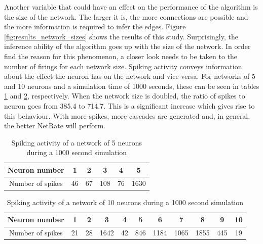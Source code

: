 Another variable that could have an effect on the performance of the algorithm is the size of the network. The larger it is, the more connections are possible and the more information is required to infer the edges. Figure \ref{fig:results_network_sizes} shows the results of this study. Surprisingly, the inference ability of the algorithm goes up with the size of the network. In order find the reason for this phenomenon, a closer look needs to be taken to the number of firings for each network size. Spiking activity conveys information about the effect the neuron has on the network and vice-versa. For networks of 5 and 10 neurons and a simulation time of 1000 seconds, these can be seen in tables \ref{tab:spiking_activity_5_neurons} and \ref{tab:spiking_activity_10_neurons}, respectively. When the network size is doubled, the ratio of spikes to neuron goes from 385.4 to 714.7. This is a significant increase which gives rise to this behaviour. With more spikes, more cascades are generated and, in general, the better NetRate will perform.\\

\begin{table}[]
\centering
\begin{tabular}{|c|c|c|c|c|c|}
\hline
Neuron number    & 1  & 2  & 3   & 4  & 5    \\ \hline
Number of spikes & 46 & 67 & 108 & 76 & 1630 \\ \hline
\end{tabular}
\caption{Spiking activity of a network of 5 neurons during a 1000 second simulation}
\label{tab:spiking_activity_5_neurons}
\end{table}

\begin{table}[]
\centering
\begin{tabular}{|c|c|c|c|c|c|c|c|c|c|c|}
\hline
Neuron number    & 1  & 2  & 3    & 4  & 5   & 6    & 7    & 8    & 9   & 10 \\ \hline
Number of spikes & 21 & 28 & 1642 & 42 & 846 & 1184 & 1065 & 1855 & 445 & 19 \\ \hline
\end{tabular}
\caption{Spiking activity of a network of 10 neurons during a 1000 second simulation}
\label{tab:spiking_activity_10_neurons}
\end{table}


